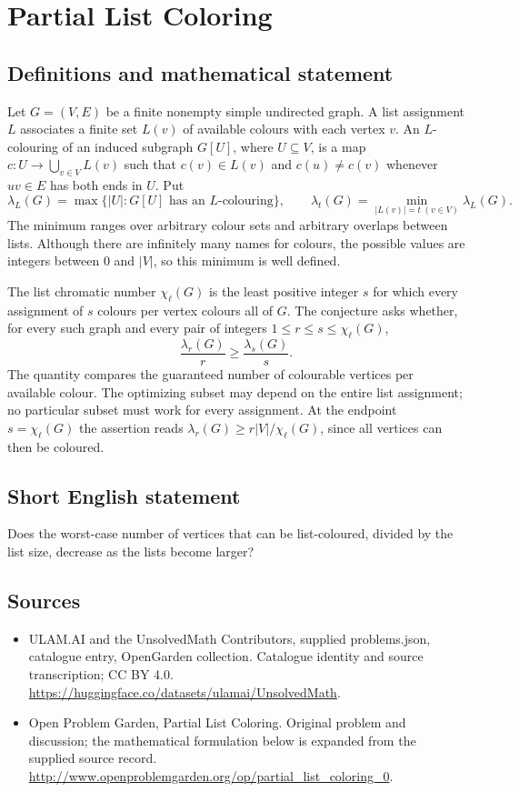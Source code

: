 \documentclass[11pt,a4paper]{article}
\begin{document}
\section*{Partial List Coloring}\label{statement}

\subsection{Definitions and mathematical statement}
Let $G=(V,E)$ be a finite nonempty simple undirected graph. A list assignment
$L$ associates a finite set $L(v)$ of available colours with each vertex $v$.
An $L$-colouring of an induced subgraph $G[U]$, where $U\subseteq V$, is a
map $c:U\to\bigcup_{v\in V}L(v)$ such that $c(v)\in L(v)$ and
$c(u)\ne c(v)$ whenever $uv\in E$ has both ends in $U$. Put
\[
 \lambda_L(G)=\max\{|U|:G[U]\text{ has an }L\text{-colouring}\},
 \qquad
 \lambda_t(G)=\min_{|L(v)|=t\ (v\in V)}\lambda_L(G).
\]
The minimum ranges over arbitrary colour sets and arbitrary overlaps between
lists. Although there are infinitely many names for colours, the possible
values are integers between $0$ and $|V|$, so this minimum is well defined.

The list chromatic number $\chi_\ell(G)$ is the least positive integer $s$
for which every assignment of $s$ colours per vertex colours all of $G$.
The conjecture asks whether, for every such graph and every pair of integers
$1\le r\le s\le\chi_\ell(G)$,
\[
                 \frac{\lambda_r(G)}r\ge\frac{\lambda_s(G)}s.
\]
The quantity compares the guaranteed number of colourable vertices per
available colour. The optimizing subset may depend on the entire list
assignment; no particular subset must work for every assignment. At the
endpoint $s=\chi_\ell(G)$ the assertion reads
$\lambda_r(G)\ge r|V|/\chi_\ell(G)$, since all vertices can then be coloured.
\subsection{Short English statement}
Does the worst-case number of vertices that can be list-coloured, divided by the list size, decrease as the lists become larger?
\subsection{Sources}
\begin{itemize}
\item[S1] ULAM.AI and the UnsolvedMath Contributors, supplied problems.json, catalogue entry, OpenGarden collection. Catalogue identity and source transcription; CC BY 4.0.
\url{https://huggingface.co/datasets/ulamai/UnsolvedMath}.
\item[S2] Open Problem Garden, Partial List Coloring. Original problem and discussion; the mathematical formulation below is expanded from the supplied source record.
\url{http://www.openproblemgarden.org/op/partial_list_coloring_0}.
\end{itemize}
\end{document}
